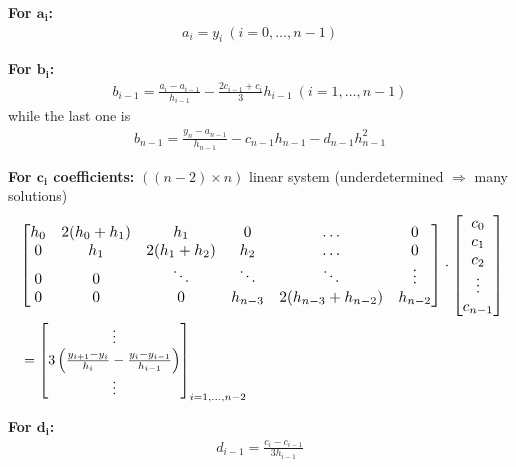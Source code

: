 \begin{snugshade*}
    \textbf{For $\mathbf{a_i}$:}
    \begin{align}
        \label{spline-a}
        a_i = y_i\ (i=0,\ldots,n-1)
    \end{align}
\end{snugshade*}
\begin{snugshade*}
    \textbf{For $\mathbf{b_i}$:}
    \begin{align}
        \label{spline-b}
        b_{i-1}=\frac{a_i-a_{i-1}}{h_{i-1}}-\frac{2c_{i-1}+c_i}{3}h_{i-1}\ (i=1,\ldots,n-1)
    \end{align}
    while the last one is
    \begin{align}
        \label{spline-bn}
        b_{n-1} = \frac{y_n - a_{n-1}}{h_{n-1}}-c_{n-1}h_{n-1}-d_{n-1}h_{n-1}^2
    \end{align}
\end{snugshade*}
\begin{snugshade*}
    \textbf{For $\mathbf{c_i}$ coefficients:} $((n-2)\times n)$ linear system
    (underdetermined $\Rightarrow$ many solutions)
    \begin{align*}
        \ & \resizebox{\columnwidth}{!}{$
        \begin{bmatrix}
            h_0 & 2(h_0 + h_1) & h_1          & 0       & \hdots               & 0       \\
            0   & h_1          & 2(h_1 + h_2) & h_2     & \hdots               & 0       \\
            0   & 0            & \ddots       & \ddots  & \ddots               & \vdots  \\
            0   & 0            & 0            & h_{n-3} & 2(h_{n-3} + h_{n-2}) & h_{n-2}
        \end{bmatrix}\cdot
        \begin{bmatrix}
            c_0    \\
            c_1    \\
            c_2    \\
            \vdots \\
            c_{n-1}
        \end{bmatrix}
        $} \\
        \ & =
        \begin{bmatrix}
            \vdots                                                                \\
            3\left(\frac{y_{i+1} - y_i}{h_i}-\frac{y_i - y_{i-1}}{h_{i-1}}\right) \\
            \vdots
        \end{bmatrix}_{i=1,\ldots,n-2}
    \end{align*}
\end{snugshade*}
\begin{snugshade*}
    \textbf{For $\mathbf{d_i}$:}
    \begin{align}
        \label{spline-d}
        d_{i-1} = \frac{c_i - c_{i-1}}{3h_{i-1}}
    \end{align}
\end{snugshade*}

